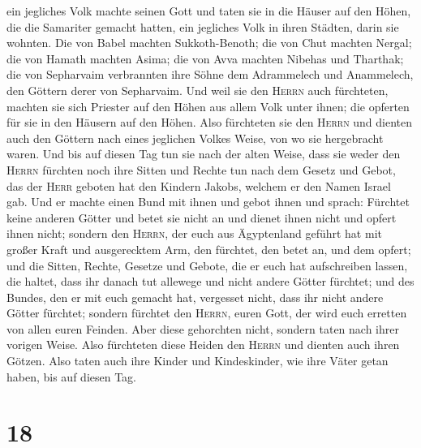 ein jegliches Volk machte seinen Gott und taten sie in die Häuser auf
den Höhen, die die Samariter gemacht hatten, ein jegliches Volk in ihren
Städten, darin sie wohnten.  Die von Babel machten
Sukkoth-Benoth; die von Chut machten Nergal; die von Hamath machten
Asima;  die von Avva machten Nibehas und Tharthak; die
von Sepharvaim verbrannten ihre Söhne dem Adrammelech und Anammelech,
den Göttern derer von Sepharvaim.  Und weil sie den
\textsc{Herrn} auch fürchteten, machten sie sich Priester auf den Höhen
aus allem Volk unter ihnen; die opferten für sie in den Häusern auf den
Höhen.  Also fürchteten sie den \textsc{Herrn} und
dienten auch den Göttern nach eines jeglichen Volkes Weise, von wo sie
hergebracht waren.  Und bis auf diesen Tag tun sie nach
der alten Weise, dass sie weder den \textsc{Herrn} fürchten noch ihre
Sitten und Rechte tun nach dem Gesetz und Gebot, das der \textsc{Herr}
geboten hat den Kindern Jakobs, welchem er den Namen Israel gab.
 Und er machte einen Bund mit ihnen und gebot ihnen und
sprach: Fürchtet keine anderen Götter und betet sie nicht an und dienet
ihnen nicht und opfert ihnen nicht;  sondern den
\textsc{Herrn}, der euch aus Ägyptenland geführt hat mit großer Kraft
und ausgerecktem Arm, den fürchtet, den betet an, und dem opfert;
 und die Sitten, Rechte, Gesetze und Gebote, die er euch
hat aufschreiben lassen, die haltet, dass ihr danach tut allewege und
nicht andere Götter fürchtet;  und des Bundes, den er mit
euch gemacht hat, vergesset nicht, dass ihr nicht andere Götter
fürchtet;  sondern fürchtet den \textsc{Herrn}, euren
Gott, der wird euch erretten von allen euren Feinden. 
Aber diese gehorchten nicht, sondern taten nach ihrer vorigen Weise.
 Also fürchteten diese Heiden den \textsc{Herrn} und
dienten auch ihren Götzen. Also taten auch ihre Kinder und Kindeskinder,
wie ihre Väter getan haben, bis auf diesen Tag.

\hypertarget{section-17}{%
\section{18}\label{section-17}}

